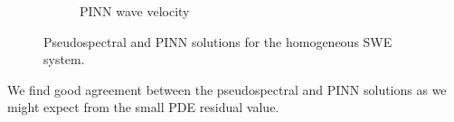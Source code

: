 \begin{figure}[h]
\begin{subfigure}[b]{0.45\textwidth}
        \caption{PINN wave velocity}
        \label{fig:homogeneous_pinn_swe_velocity}
    \end{subfigure}
    \caption{Pseudospectral and PINN solutions for the homogeneous SWE system.}
    \label{fig:homogeneous_swe_solution}
\end{figure}

We find good agreement between the pseudospectral and PINN solutions as we might expect from the small PDE residual value.